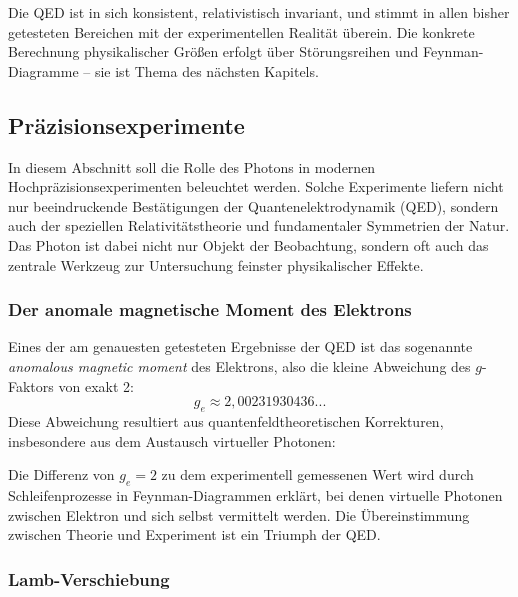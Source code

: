 Die QED ist in sich konsistent, relativistisch invariant, und stimmt in allen bisher getesteten Bereichen mit der experimentellen Realität überein. Die konkrete Berechnung physikalischer Größen erfolgt über Störungsreihen und Feynman-Diagramme – sie ist Thema des nächsten Kapitels.

\subsection{Präzisionsexperimente}

In diesem Abschnitt soll die Rolle des Photons in modernen Hochpräzisionsexperimenten beleuchtet werden. Solche Experimente liefern nicht nur beeindruckende Bestätigungen der Quantenelektrodynamik (QED), sondern auch der speziellen Relativitätstheorie und fundamentaler Symmetrien der Natur. Das Photon ist dabei nicht nur Objekt der Beobachtung, sondern oft auch das zentrale Werkzeug zur Untersuchung feinster physikalischer Effekte.

\subsubsection{Der anomale magnetische Moment des Elektrons}

Eines der am genauesten getesteten Ergebnisse der QED ist das sogenannte \emph{anomalous magnetic moment} des Elektrons, also die kleine Abweichung des $g$-Faktors von exakt 2:
\[
g_e \approx 2{,}00231930436...
\]
Diese Abweichung resultiert aus quantenfeldtheoretischen Korrekturen, insbesondere aus dem Austausch virtueller Photonen:
\medskip
\begin{tcolorbox}[physikbox,title=Physikalische Bedeutung]
	\label{box:physikalische Bedeutung}
	Die Differenz von $g_e = 2$ zu dem experimentell gemessenen Wert wird durch Schleifenprozesse in Feynman-Diagrammen erklärt, bei denen virtuelle Photonen zwischen Elektron und sich selbst vermittelt werden. Die Übereinstimmung zwischen Theorie und Experiment ist ein Triumph der QED.
\end{tcolorbox}

\subsubsection{Lamb-Verschiebung}

